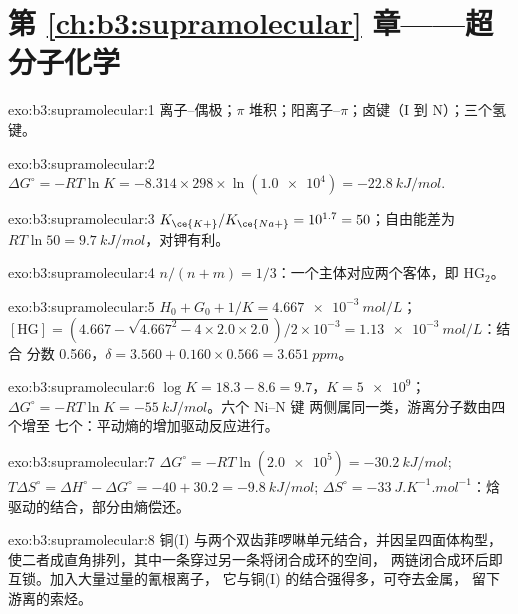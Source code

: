 \section*{第 \ref{ch:b3:supramolecular} 章——超分子化学}

\begin{solution}{exo:b3:supramolecular:1}
离子–偶极；$\pi$ 堆积；阳离子--$\pi$；卤键（I 到 N）；三个氢键。
\end{solution}

\begin{solution}{exo:b3:supramolecular:2}
$\Delta G^\circ = -RT\ln K = -8.314 \times 298 \times \ln(\num{1.0e4}) = \qty{-22.8}{kJ/mol}$.
\end{solution}

\begin{solution}{exo:b3:supramolecular:3}
$K_{\ce{K+}}/K_{\ce{Na+}} = 10^{1.7} = 50$；自由能差为 $RT\ln 50 = \qty{9.7}{kJ/mol}$，对钾有利。
\end{solution}

\begin{solution}{exo:b3:supramolecular:4}
$n/(n + m) = 1/3$：一个主体对应两个客体，即 $\mathrm{HG_2}$。
\end{solution}

\begin{solution}{exo:b3:supramolecular:5}
$H_0 + G_0 + 1/K = \qty{4.667e-3}{mol/L}$；$[\mathrm{HG}] = (4.667 - \sqrt{4.667^2 - 4 \times 2.0 \times 2.0})/2 \times 10^{-3} = \qty{1.13e-3}{mol/L}$：结合
分数 0.566，$\delta = 3.560 + 0.160 \times 0.566 = \qty{3.651}{ppm}$。
\end{solution}

\begin{solution}{exo:b3:supramolecular:6}
$\log K = 18.3 - 8.6 = 9.7$，$K = \num{5e9}$；$\Delta G^\circ = -RT\ln K = \qty{-55}{kJ/mol}$。六个 Ni--N 键
两侧属同一类，游离分子数由四个增至
七个：平动熵的增加驱动反应进行。
\end{solution}

\begin{solution}{exo:b3:supramolecular:7}
$\Delta G^\circ = -RT\ln(\num{2.0e5}) = \qty{-30.2}{kJ/mol}$; $T\Delta S^\circ = \Delta H^\circ - \Delta G^\circ = -40 + 30.2 = \qty{-9.8}{kJ/mol}$;
$\Delta S^\circ = \qty{-33}{J.K^{-1}.mol^{-1}}$：焓驱动的结合，部分由熵偿还。
\end{solution}

\begin{solution}{exo:b3:supramolecular:8}
铜(I) 与两个双齿菲啰啉单元结合，并因呈四面体构型，
使二者成直角排列，其中一条穿过另一条将闭合成环的空间，
两链闭合成环后即互锁。加入大量过量的氰根离子，
它与铜(I) 的结合强得多，可夺去金属，
留下游离的索烃。
\end{solution}

